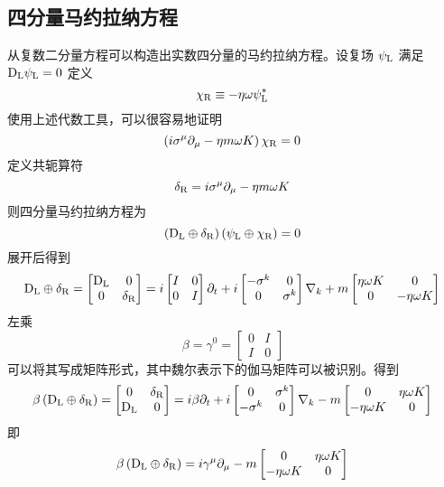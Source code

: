 \subsection{四分量马约拉纳方程}  
从复数二分量方程可以构造出实数四分量的马约拉纳方程。设复场 \(\psi_{\rm{L}}\) 满足\(\mathrm{D}_{\rm{L}} \psi_{\rm{L}} = 0\)
定义
\[
\chi_{\rm{R}} \equiv -\eta \omega \psi_{\rm{L}}^{*}~
\]
使用上述代数工具，可以很容易地证明
\[
\left(i \sigma^{\mu} \partial_{\mu} - \eta m \omega K \right) \chi_{\rm{R}} = 0~
\]
定义共轭算符
\[
\delta_{\rm{R}} = i \sigma^{\mu} \partial_{\mu} - \eta m \omega K~
\]
则四分量马约拉纳方程为
\[
\left( \mathrm{D}_{\rm{L}} \oplus \delta_{\rm{R}} \right) \left( \psi_{\rm{L}} \oplus \chi_{\rm{R}} \right) = 0~
\]
展开后得到
\[
\mathrm{D}_{\rm{L}} \oplus \delta_{\rm{R}} = \begin{bmatrix} \mathrm{D}_{\rm{L}} & 0 \\ 0 & \delta_{\rm{R}} \end{bmatrix} = i \begin{bmatrix} I & 0 \\ 0 & I \end{bmatrix} \partial_{t} + i \begin{bmatrix} -\sigma^{k} & 0 \\ 0 & \sigma^{k} \end{bmatrix} \nabla_{k} + m \begin{bmatrix} \eta \omega K & 0 \\ 0 & -\eta \omega K \end{bmatrix}~
\]
左乘
\[
\beta = \gamma^{0} = \begin{bmatrix} 0 & I \\ I & 0 \end{bmatrix}~
\]
可以将其写成矩阵形式，其中魏尔表示下的伽马矩阵可以被识别。得到
\[
\beta \left( \mathrm{D}_{\rm{L}} \oplus \delta_{\rm{R}} \right) = \begin{bmatrix} 0 & \delta_{\rm{R}} \\ \mathrm{D}_{\rm{L}} & 0 \end{bmatrix} = i \beta \partial_{t} + i \begin{bmatrix} 0 & \sigma^{k} \\ -\sigma^{k} & 0 \end{bmatrix} \nabla_{k} - m \begin{bmatrix} 0 & \eta \omega K \\ -\eta \omega K & 0 \end{bmatrix}~
\]
即
\[
\beta \left( \mathrm{D}_{\rm{L}} \oplus \delta_{\rm{R}} \right) = i \gamma^{\mu} \partial_{\mu} - m \begin{bmatrix} 0 & \eta \omega K \\ -\eta \omega K & 0 \end{bmatrix}~
\]
